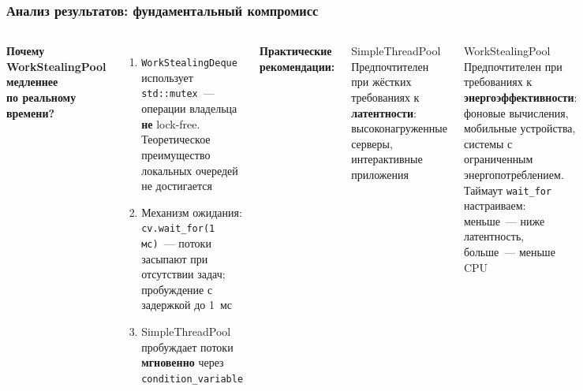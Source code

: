 \documentclass[pdf, hyperref={unicode}, aspectratio=169]{beamer}
\begin{document}
\begin{frame}
\frametitle{Анализ результатов: фундаментальный компромисс}

\begin{columns}[T]

\textbf{Почему WorkStealingPool медленнее\\по реальному времени?}

\begin{enumerate}
  \item \texttt{WorkStealingDeque} использует
        \texttt{std::mutex}~--- операции
        владельца \textbf{не} lock-free.\\
        Теоретическое преимущество
        локальных очередей не достигается
  \item Механизм ожидания:
        \texttt{cv.wait\_for(1\,мс)}~---
        потоки засыпают при отсутствии
        задач; пробуждение с задержкой
        до 1~мс
  \item SimpleThreadPool пробуждает
        потоки \textbf{мгновенно} через
        \texttt{condition\_variable}
\end{enumerate}

\textbf{Практические рекомендации:}

\begin{block}{SimpleThreadPool}
  Предпочтителен при жёстких
  требованиях к \textbf{латентности}:
  высоконагруженные серверы,
  интерактивные приложения
\end{block}

\begin{block}{WorkStealingPool}
  Предпочтителен при требованиях
  к \textbf{энергоэффективности}:
  фоновые вычисления, мобильные
  устройства, системы с ограниченным
  энергопотреблением.\\
  \medskip
  Таймаут \texttt{wait\_for} настраиваем:
  меньше~--- ниже латентность,
  больше~--- меньше CPU
\end{block}

\end{columns}
\end{frame}
\end{document}
